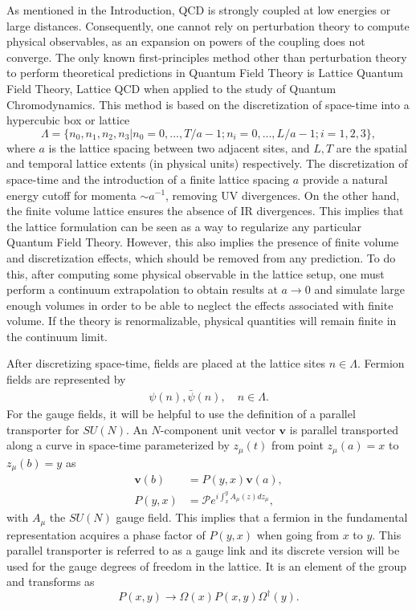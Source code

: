 As mentioned in the Introduction, QCD is strongly coupled at low energies or large distances. Consequently, one cannot rely on perturbation theory to compute physical observables, as an expansion on powers of the coupling does not converge. The only known first-principles method other than perturbation theory to perform theoretical predictions in Quantum Field Theory is Lattice Quantum Field Theory, Lattice QCD when applied to the study of Quantum Chromodynamics. This method is based on the discretization of space-time into a hypercubic box or lattice
\begin{equation}
\Lambda=\{n_0,n_1,n_2,n_3|n_0=0,...,T/a-1;n_i=0,...,L/a-1;i=1,2,3\},
\end{equation} 
where $a$ is the lattice spacing between two adjacent sites, and $L,T$ are the spatial and temporal lattice extents (in physical units) respectively. The discretization of space-time and the introduction of a finite lattice spacing $a$ provide a natural energy cutoff for momenta $\sim a^{-1}$, removing UV divergences. On the other hand, the finite volume lattice ensures the absence of IR divergences. This implies that the lattice formulation can be seen as a way to regularize any particular Quantum Field Theory. However, this also implies the presence of finite volume and discretization effects, which should be removed from any prediction. To do this, after computing some physical observable in the lattice setup, one must perform a continuum extrapolation to obtain results at $a\rightarrow0$ and simulate large enough volumes in order to be able to neglect the effects associated with finite volume. If the theory is renormalizable, physical quantities will remain finite in the continuum limit.

After discretizing space-time, fields are placed at the lattice sites $n\in\Lambda$. Fermion fields are represented by
\begin{gather}
\psi(n),\bar{\psi}(n), \quad
n\in\Lambda.
\end{gather}
For the gauge fields, it will be helpful to use the definition of a parallel transporter for $SU(N)$. An $N$-component unit vector $\boldsymbol{v}$ is parallel transported along a curve in space-time parameterized by $z_{\mu}(t)$ from point $z_{\mu}(a)=x$ to $z_{\mu}(b)=y$ as
\begin{align}
\boldsymbol{v}(b)&=P(y,x)\boldsymbol{v}(a),\\
P(y,x)&=\mathcal{P}e^{i\int_x^yA_{\mu}(z)dz_{\mu}},
\end{align}
with $A_{\mu}$ the $SU(N)$ gauge field. This implies that a fermion in the fundamental representation acquires a phase factor of $P(y,x)$ when going from $x$ to $y$. This parallel transporter is referred to as a gauge link and its discrete version will be used for the gauge degrees of freedom in the lattice. It is an element of the group and transforms as
\begin{equation}
P(x,y)\to\Omega(x)P(x,y)\Omega^{\dagger}(y).
\end{equation}

